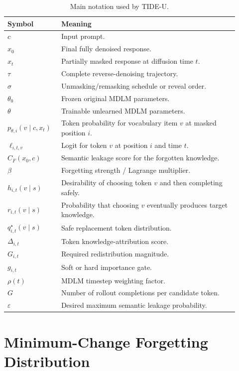 \documentclass[10pt]{article}
\newcommand{\1}{\mathbb{I}}
\begin{document}
\begin{table}[t]
\centering
\caption{Main notation used by TIDE-U.}
\label{tab:notation}
\small
\begin{tabular}{p{0.20\linewidth}p{0.72\linewidth}}
\toprule
Symbol & Meaning \\
\midrule
$c$ & Input prompt. \\
$x_0$ & Final fully denoised response. \\
$x_t$ & Partially masked response at diffusion time $t$. \\
$\tau$ & Complete reverse-denoising trajectory. \\
$\sigma$ & Unmasking/remasking schedule or reveal order. \\
$\theta_0$ & Frozen original MDLM parameters. \\
$\theta$ & Trainable unlearned MDLM parameters. \\
$p_{\theta,i}(v\mid c,x_t)$ & Token probability for vocabulary item $v$ at masked position $i$. \\
$\ell_{i,t,v}$ & Logit for token $v$ at position $i$ and time $t$. \\
$C_F(x_0,c)$ & Semantic leakage score for the forgotten knowledge. \\
$\beta$ & Forgetting strength / Lagrange multiplier. \\
$h_{i,t}(v\mid s)$ & Desirability of choosing token $v$ and then completing safely. \\
$r_{i,t}(v\mid s)$ & Probability that choosing $v$ eventually produces target knowledge. \\
$q^\star_{i,t}(v\mid s)$ & Safe replacement token distribution. \\
$\Delta_{i,t}$ & Token knowledge-attribution score. \\
$G_{i,t}$ & Required redistribution magnitude. \\
$g_{i,t}$ & Soft or hard importance gate. \\
$\rho(t)$ & MDLM timestep weighting factor. \\
$G$ & Number of rollout completions per candidate token. \\
$\varepsilon$ & Desired maximum semantic leakage probability. \\
\bottomrule
\end{tabular}
\end{table}

\section{Minimum-Change Forgetting Distribution}
\end{document}
